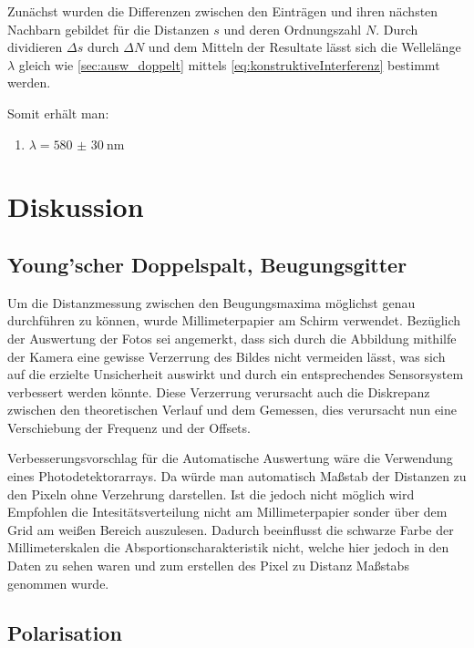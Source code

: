 \documentclass[12pt,english,ngerman]{scrartcl}
\begin{document}
Zunächst wurden die Differenzen zwischen den Einträgen und ihren nächsten
Nachbarn gebildet für die Distanzen $s$ und deren Ordnungszahl $N$. Durch
dividieren $\Delta s$ durch $\Delta N$ und dem Mitteln der Resultate lässt sich
die Wellelänge $\lambda$ gleich wie \autoref{sec:ausw_doppelt} mittels
\autoref{eq:konstruktiveInterferenz} bestimmt werden.

Somit erhält man:
\begin{enumerate}
	\item $\lambda = \SI{580(30)}{\nm}$
\end{enumerate}

\section{Diskussion}\label{sec:diskussion}

\subsection{Young'scher Doppelspalt, Beugungsgitter}

Um die Distanzmessung zwischen den Beugungsmaxima möglichst genau durchführen
zu können, wurde Millimeterpapier am Schirm verwendet. Bezüglich der Auswertung
der Fotos sei angemerkt, dass sich durch die Abbildung mithilfe der Kamera eine
gewisse Verzerrung des Bildes nicht vermeiden lässt, was sich auf die erzielte
Unsicherheit auswirkt und durch ein entsprechendes Sensorsystem verbessert
werden könnte. Diese Verzerrung verursacht auch die Diskrepanz zwischen den
theoretischen Verlauf und dem Gemessen, dies verursacht nun eine Verschiebung
der Frequenz und der Offsets.

Verbesserungsvorschlag für die Automatische Auswertung wäre die Verwendung eines Photodetektorarrays. 
Da würde man automatisch Maßstab der Distanzen zu den Pixeln ohne Verzehrung darstellen. Ist die jedoch
nicht möglich wird Empfohlen die Intesitätsverteilung nicht am Millimeterpapier sonder über dem 
Grid am weißen Bereich auszulesen. Dadurch beeinflusst die schwarze Farbe der Millimeterskalen
die Absportionscharakteristik nicht, welche hier jedoch in den Daten zu sehen waren und zum
erstellen des Pixel zu Distanz Maßstabs genommen wurde.

\subsection{Polarisation}
\end{document}
